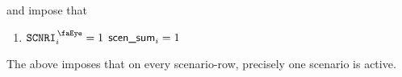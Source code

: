 and impose that
\begin{enumerate}
	\item \If $\isMxpScenario _{i} = 1$ \Then $\textsf{scen\_sum} _{i} = 1$
\end{enumerate}
\saNote{}
The above imposes that on every scenario-row, precisely one scenario is active.
